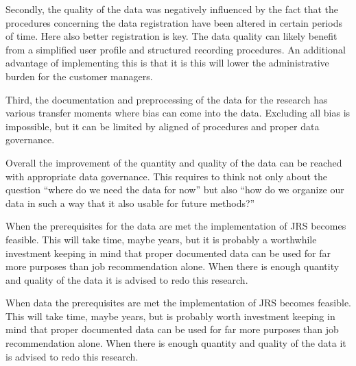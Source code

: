 Secondly, the quality of the data was negatively influenced by the fact that the procedures concerning the data registration have been altered in certain periods of time.
Here also better registration is key.
The data quality can likely benefit from a simplified user profile and structured recording procedures. 
An additional advantage of implementing this is that it is this will lower the administrative burden for the customer managers.

Third, the documentation and preprocessing of the data for the research has various transfer moments where bias can come into the data. 
Excluding all bias is impossible, but it can be limited by aligned of procedures and proper data governance.

Overall the improvement of the quantity and quality of the data can be reached with appropriate data governance. 
This requires to think not only about the question “where do we need the data for now” but also “how do we organize our data in such a way that it also usable for future methods?”

When the prerequisites for the data are met the implementation of JRS becomes feasible.
This will take time, maybe years, but it is probably a worthwhile  investment keeping in mind that proper documented data can be used for far more purposes than job recommendation alone.
When there is enough quantity and quality of the data it is advised to redo this research. 


When data the prerequisites are met the implementation of JRS becomes feasible.
This will take time, maybe years, but is probably worth investment keeping in mind that proper documented data can be used for far more purposes than job recommendation alone.
When there is enough quantity and quality of the data it is advised to redo this research. 

